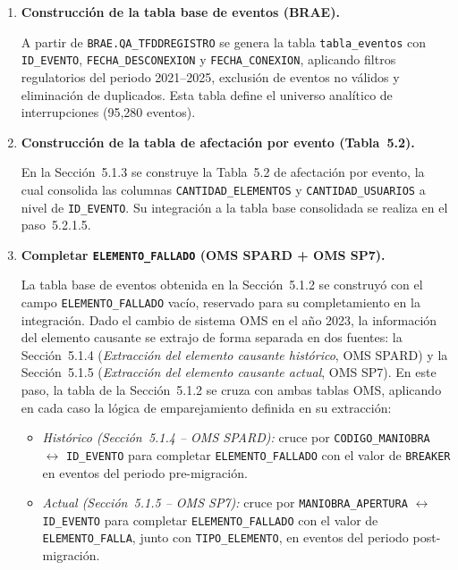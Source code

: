 {\sloppy
\renewcommand{\theenumi}{\thesubsection.\arabic{enumi}}
\renewcommand{\labelenumi}{\theenumi}
\begin{enumerate}
    \item \textbf{Construcción de la tabla base de eventos (BRAE).}\mbox{}\par\vspace{0.2em}\noindent
    A partir de \texttt{BRAE.QA\_TFDDREGISTRO} se genera la tabla \texttt{tabla\_eventos} con \texttt{ID\_EVENTO}, \texttt{FECHA\_DESCONEXION} y \texttt{FECHA\_CONEXION}, aplicando filtros regulatorios del periodo 2021--2025, exclusión de eventos no válidos y eliminación de duplicados. Esta tabla define el universo analítico de interrupciones (95{,}280 eventos).

    \item \textbf{Construcción de la tabla de afectación por evento (Tabla~5.2).}\mbox{}\par\vspace{0.2em}\noindent
    En la Sección~5.1.3 se construye la Tabla~5.2 de afectación por evento, la cual consolida las columnas \texttt{CANTIDAD\_ELEMENTOS} y \texttt{CANTIDAD\_USUARIOS} a nivel de \texttt{ID\_EVENTO}. Su integración a la tabla base consolidada se realiza en el paso~5.2.1.5.

    \item \textbf{Completar \texttt{ELEMENTO\_FALLADO} (OMS SPARD + OMS SP7).}\mbox{}\par\vspace{0.2em}\noindent
    La tabla base de eventos obtenida en la Sección~5.1.2 se construyó con el campo \texttt{ELEMENTO\_FALLADO} vacío, reservado para su completamiento en la integración. Dado el cambio de sistema OMS en el año 2023, la información del elemento causante se extrajo de forma separada en dos fuentes: la Sección~5.1.4 (\emph{Extracción del elemento causante histórico}, OMS SPARD) y la Sección~5.1.5 (\emph{Extracción del elemento causante actual}, OMS SP7). En este paso, la tabla de la Sección~5.1.2 se cruza con ambas tablas OMS, aplicando en cada caso la lógica de emparejamiento definida en su extracción:
    \begin{itemize}
        \item \emph{Histórico (Sección~5.1.4 -- OMS SPARD):} cruce por \texttt{CODIGO\_MANIOBRA} $\leftrightarrow$ \texttt{ID\_EVENTO} para completar \texttt{ELEMENTO\_FALLADO} con el valor de \texttt{BREAKER} en eventos del periodo pre-migración.
        \item \emph{Actual (Sección~5.1.5 -- OMS SP7):} cruce por \texttt{MANIOBRA\_APERTURA} $\leftrightarrow$ \texttt{ID\_EVENTO} para completar \texttt{ELEMENTO\_FALLADO} con el valor de \texttt{ELEMENTO\_FALLA}, junto con \texttt{TIPO\_ELEMENTO}, en eventos del periodo post-migración.
    \end{itemize}


\end{enumerate}}

